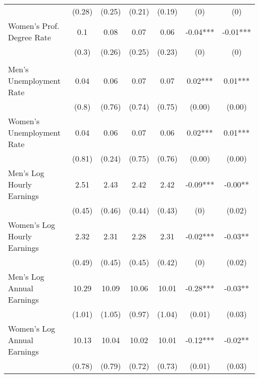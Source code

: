 \begin{landscape}
\begin{ThreePartTable}
\begin{longtable}{@{}l*{6}{c}@{}}
 & (0.28) & (0.25) & (0.21) & (0.19) & (0) & (0) \\
Women's Prof. Degree Rate & 0.1 & 0.08 & 0.07 & 0.06 & -0.04*** & -0.01*** \\
 & (0.3) & (0.26) & (0.25) & (0.23) & (0) & (0) \\
\addlinespace
\multicolumn{7}{@{}l}{\textbf{Panel C: Children's Employment and Earnings}}\\
Men's Unemployment Rate & 0.04 & 0.06 & 0.07 & 0.07 & 0.02*** & 0.01*** \\
 & (0.8) & (0.76) & (0.74) & (0.75) & (0.00) & (0.00) \\
Women's Unemployment Rate & 0.04 & 0.06 & 0.07 & 0.06 & 0.02*** & 0.01*** \\
 & (0.81) & (0.24) & (0.75) & (0.76) & (0.00) & (0.00) \\
Men's Log Hourly Earnings & 2.51 & 2.43 & 2.42 & 2.42 & -0.09*** & -0.00** \\
 & (0.45) & (0.46) & (0.44) & (0.43) & (0) & (0.02) \\
Women's Log Hourly Earnings & 2.32 & 2.31 & 2.28 & 2.31 & -0.02*** & -0.03** \\
 & (0.49) & (0.45) & (0.45) & (0.42) & (0) & (0.02) \\
Men's Log Annual Earnings & 10.29 & 10.09 & 10.06 & 10.01 & -0.28*** & -0.03** \\
 & (1.01) & (1.05) & (0.97) & (1.04) & (0.01) & (0.03) \\
Women's Log Annual Earnings & 10.13 & 10.04 & 10.02 & 10.01 & -0.12*** & -0.02** \\
 & (0.78) & (0.79) & (0.72) & (0.73) & (0.01) & (0.03) \\
\end{longtable}
\end{ThreePartTable}
\end{landscape}